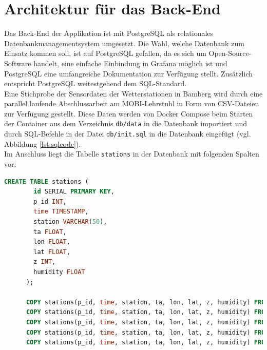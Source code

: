 \section{Architektur für das Back-End}
Das Back-End der Applikation ist mit PostgreSQL als relationales Datenbankmanagementsystem umgesetzt. Die Wahl, welche Datenbank zum Einsatz kommen soll, ist auf PostgreSQL gefallen, da es sich um Open-Source-Software handelt, eine einfache Einbindung in Grafana möglich ist und PostgreSQL eine umfangreiche Dokumentation zur Verfügung stellt. Zusätzlich entspricht PostgreSQL weitestgehend dem SQL-Standard. \\ Eine Stichprobe der Sensordaten der Wetterstationen in Bamberg wird durch eine parallel laufende Abschlussarbeit am \ac{MOBI-Lehrstuhl} in Form von CSV-Dateien zur Verfügung gestellt. Diese Daten werden von Docker Compose beim Starten der Container aus dem Verzeichnis \texttt{db/data} in die Datenbank importiert und durch SQL-Befehle in der Datei \texttt{db/init.sql} in die Datenbank eingefügt (vgl. Abbildung \ref{lst:sqlcode}). \\ Im Anschluss liegt die Tabelle \texttt{stations} in der Datenbank mit folgenden Spalten vor:

\begin{lstlisting}[language=SQL,float=t,
      caption={SQL-Befehle zum Erstellen der Tabelle \texttt{stations} in der Datenbank},label={lst:sqlcode}]
      CREATE TABLE stations (
        id SERIAL PRIMARY KEY,
        p_id INT,
        time TIMESTAMP,
        station VARCHAR(50),
        ta FLOAT,
        lon FLOAT,
        lat FLOAT,
        z INT,
        humidity FLOAT
      );
      
      COPY stations(p_id, time, station, ta, lon, lat, z, humidity) FROM '/data/Bamberg_Stations 01.03.2023to31.03.2023.csv' DELIMITER ';' CSV HEADER;
      COPY stations(p_id, time, station, ta, lon, lat, z, humidity) FROM '/data/Bamberg_Stations 01.04.2023to30.04.2023.csv' DELIMITER ';' CSV HEADER;
      COPY stations(p_id, time, station, ta, lon, lat, z, humidity) FROM '/data/Bamberg_Stations 01.06.2023to30.06.2023.csv' DELIMITER ';' CSV HEADER;
      COPY stations(p_id, time, station, ta, lon, lat, z, humidity) FROM '/data/Bamberg_Stations 01.07.2023to31.07.2023.csv' DELIMITER ';' CSV HEADER;
      COPY stations(p_id, time, station, ta, lon, lat, z, humidity) FROM '/data/Bamberg_Stations 01.08.2023to10.08.2023.csv' DELIMITER ';' CSV HEADER;
      
\end{lstlisting}

